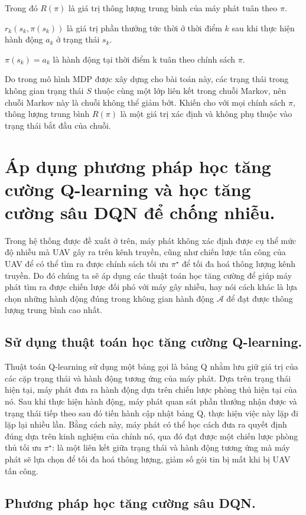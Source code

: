 \documentclass{uetgraduation}
\begin{document}
Trong đó $R(\pi)$ là giá trị thông lượng trung bình của máy phát tuân theo $\pi$.

$r_k(s_k, \pi(s_k))$ là giá trị phần thưởng tức thời ở thời điểm $k$ sau khi thực hiện hành động $a_k$ ở trạng thái $s_k$. 

$\pi(s_k) = a_k$ là hành động tại thời điểm k tuân theo chính sách $\pi$.

Do trong mô hình MDP được xây dựng cho bài toán này, các trạng thái trong không gian trạng thái $S$ thuộc cùng một lớp liên kết trong chuỗi Markov, nên chuỗi Markov này là chuỗi không thể giảm bớt.
Khiến cho với mọi chính sách $\pi$, thông lượng trung bình $R(\pi)$ là một giá trị xác định và không phụ thuộc vào trạng thái bắt đầu của chuỗi.

\section{Áp dụng phương pháp học tăng cường Q-learning và học tăng cường sâu DQN để chống nhiễu.}
Trong hệ thống được đề xuất ở trên, máy phát không xác định được cụ thể mức độ nhiễu mà UAV gây ra trên kênh truyền, cũng như chiến lược tấn công của UAV để có thể tìm ra được
chính sách tối ưu $\pi^\star$ để tối đa hoá thông lượng kênh truyền. Do đó chúng ta sẽ áp dụng các thuật toán học tăng cường để giúp máy phát tìm ra được chiến lược đối
phó với máy gây nhiễu, hay nói cách khác là lựa chọn những hành động đúng trong không gian hành động $\mathcal{A}$ để đạt được thông lượng trung bình cao nhất.

\subsection{Sử dụng thuật toán học tăng cường Q-learning.}
Thuật toán Q-learning sử dụng một bảng gọi là bảng Q nhằm lưu giữ giá trị của các cặp trạng thái và hành động tương ứng của máy phát. Dựa trên trạng thái hiện tại, máy phát đưa ra hành động dựa trên
chiến lược phòng thủ hiện tại của nó. Sau khi thực hiện hành động, máy phát quan sát phần thưởng nhận được và trạng thái tiếp theo sau đó tiến hành cập nhật bảng Q, thực hiện việc này lặp đi lặp lại nhiều lần. 
Bằng cách này, máy phát có thể học cách đưa ra quyết định đúng dựa trên kinh nghiệm của chính nó, qua đó đạt được một chiến lược phòng thủ tối ưu $\pi^\star$: là một liên kết giữa trạng thái và hành động tương
ứng mà máy phát sẽ lựa chọn để tối đa hoá thông lượng, giảm số gói tin bị mất khi bị UAV tấn công.

\subsection{Phương pháp học tăng cường sâu DQN.}
\end{document}
